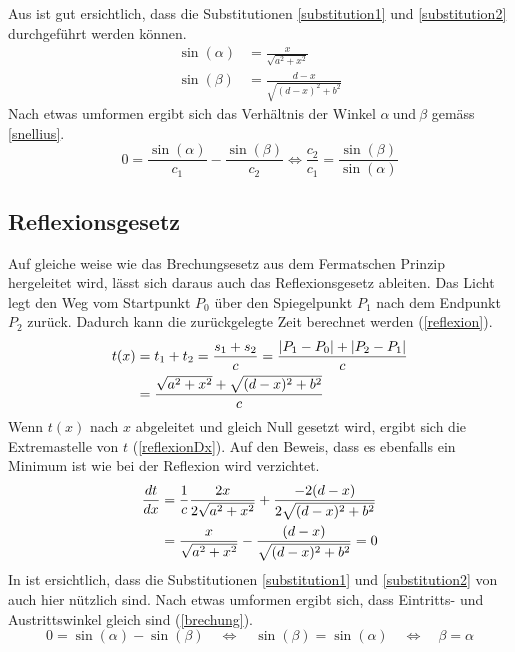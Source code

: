 Aus  ist gut ersichtlich, dass die Substitutionen \ref{substitution1} und \ref{substitution2} durchgeführt werden können.
\begin{align}
	\sin(\alpha) &= \frac{x}{\sqrt{a^2 + x^2}}  \label{substitution1}\\
	\sin(\beta) &= \frac{d-x}{\sqrt{(d -x)^2 + b^2}} \label{substitution2}
\end{align}
Nach etwas umformen ergibt sich das Verhältnis der Winkel $\alpha \ \text{und} \ \beta$ gemäss \eqref{snellius}.
\begin{equation}
	0 = \frac{\sin(\alpha)}{c_1} - \frac{\sin(\beta)}{c_2} \Leftrightarrow\frac{c_2}{c_1} = \frac{\sin(\beta)}{\sin(\alpha)}
	\label{snellius}
\end{equation}
\subsection{Reflexionsgesetz}
Auf gleiche weise wie das Brechungsesetz aus dem Fermatschen Prinzip hergeleitet wird, 
lässt sich daraus auch das Reflexionsgesetz ableiten.
Das Licht legt den Weg vom Startpunkt $P_0$ über den Spiegelpunkt $P_1$ 
nach dem Endpunkt $P_2$ zurück. Dadurch kann die zurückgelegte Zeit berechnet werden \cite{Wikipedia} (\eqref{reflexion}).
\begin{align}
t(x) &= t_1 + t_2 = \frac{s_1 + s_2}{c} = \frac{|P_1 - P_0| + |P_2 - P_1|}{c} \notag \\
&= \frac{\sqrt{a^2 + x^2} + \sqrt{(d-x)^2 + b^2}}{c} \label{reflexion}
\end{align}
Wenn $t(x)$ nach $x$ abgeleitet und gleich Null gesetzt wird, ergibt sich die Extremastelle  von $t$ (\eqref{reflexionDx}). Auf den Beweis, dass es ebenfalls ein Minimum ist wie bei der Reflexion wird verzichtet.
\begin{align}
\frac{dt}{dx} &= \frac{1}{c}  \frac{2  x}{2  \sqrt{a^2 + x^2}} + \frac{-2  (d-x)}{2  \sqrt{(d-x)^2 + b^2}} \notag \\
&= \frac{x}{ \sqrt{a^2 + x^2}} - \frac{(d-x)}{ \sqrt{(d-x)^2 + b^2}} = 0 \label{reflexionDx}
\end{align}
In  ist ersichtlich, dass die Substitutionen \ref{substitution1} und \ref{substitution2} von  auch hier nützlich sind.
Nach etwas umformen ergibt sich, dass Eintritts- und Austrittswinkel gleich sind (\eqref{brechung}).
\begin{equation}
0 = \sin(\alpha) - \sin(\beta) \quad \Leftrightarrow \quad \sin(\beta) = \sin(\alpha) \quad \Leftrightarrow\quad \beta = \alpha
\label{brechung}
\end{equation}
